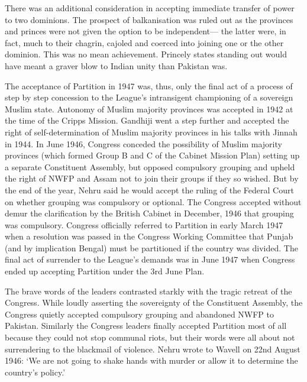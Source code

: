 There was an additional consideration in accepting immediate transfer of power to two dominions. The prospect of balkanisation was ruled out as the provinces and princes were not given the option to be independent— the latter were, in fact, much to their chagrin, cajoled and coerced into joining one or the other dominion. This was no mean achievement. Princely states standing out would have meant a graver blow to Indian unity than Pakistan was. 

The acceptance of Partition in 1947 was, thus, only the final act of a process of step by step concession to the League's intransigent championing of a sovereign Muslim state. Autonomy of Muslim majority provinces was accepted in 1942 at the time of the Cripps Mission. Gandhiji went a step further and accepted the right of self-determination of Muslim majority provinces in his talks with Jinnah in 1944. In June 1946, Congress conceded the possibility of Muslim majority provinces (which formed Group B and C of the Cabinet Mission Plan) setting up a separate Constituent Assembly, but opposed compulsory grouping and upheld the right of NWFP and Assam not to join their groups if they so wished. But by the end of the year, Nehru said he would accept the ruling of the Federal Court on whether grouping was compulsory or optional. The Congress accepted without demur the clarification by the British Cabinet in December, 1946 that grouping was compulsory. Congress officially referred to Partition in early March 1947 when a resolution was passed in the Congress Working Committee that Punjab (and by implication Bengal) must be partitioned if the country was divided. The final act of surrender to the League's demands was in June 1947 when Congress ended up accepting Partition under the 3rd June Plan. 

The brave words of the leaders contrasted starkly with the tragic retreat of the Congress. While loudly asserting the sovereignty of the Constituent Assembly, the Congress quietly accepted compulsory grouping and abandoned NWFP to Pakistan. Similarly the Congress leaders finally accepted Partition most of all because they could not stop communal riots, but their words were all about not surrendering to the blackmail of violence. Nehru wrote to Wavell on 22nd August 1946: `We are not going to shake hands with murder or allow it to determine the country's policy.' 

